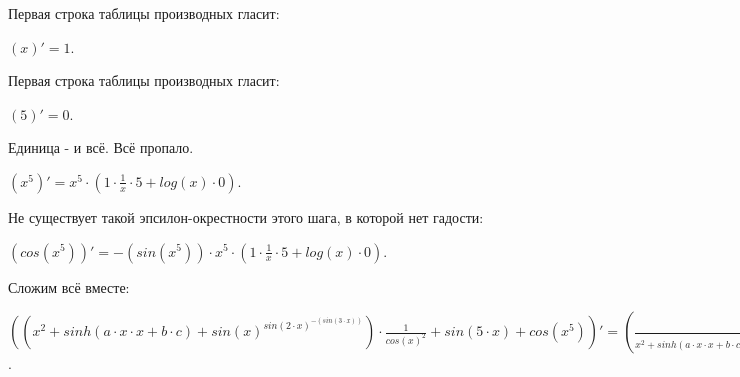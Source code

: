 \documentclass{article}
\begin{document}
Первая строка таблицы производных гласит:\\
\begin{center}$(x)' = 1$.\end{center}
Первая строка таблицы производных гласит:\\
\begin{center}$({5})' = 0$.\end{center}
Единица - и всё. Всё пропало.\\
\begin{center}$({x^{{5}}})'= {x^{{5}}} \cdot ({1} \cdot  \frac {1} {{x}} \cdot {{5}}+log(x) \cdot {0})$.\end{center}
Не существует такой эпсилон-окрестности этого шага, в которой нет гадости:\\
\begin{center}$(cos({x^{{5}}}))'= -(sin({x^{{5}}})) \cdot {x^{{5}}} \cdot ({1} \cdot  \frac {1} {{x}} \cdot {{5}}+log(x) \cdot {0})$.\end{center}
Сложим всё вместе:\\
\begin{center}$(({x^{{2}}}+sinh(a \cdot x \cdot x+b \cdot c)+{sin(x)^{sin({2} \cdot x)^{-(sin({3} \cdot x))}}}) \cdot  \frac {1} {{{cos(x)^{{2}}}}}+sin({5} \cdot x)+cos({x^{{5}}}))'= ( \frac {1} {{{x^{{2}}}+sinh(a \cdot x \cdot x+b \cdot c)+{sin(x)^{sin({2} \cdot x)^{-(sin({3} \cdot x))}}}}} \cdot ({x^{{2}}} \cdot ({1} \cdot  \frac {1} {{x}} \cdot {{2}}+log(x) \cdot {0})+cosh(a \cdot x \cdot x+b \cdot c) \cdot (( \frac {1} {{a}} \cdot {0}+ \frac {1} {{x}} \cdot {1}+ \frac {1} {{x}} \cdot {1}) \cdot a \cdot x \cdot x+( \frac {1} {{b}} \cdot {0}+ \frac {1} {{c}} \cdot {0}) \cdot b \cdot c)+{sin(x)^{sin({2} \cdot x)^{-(sin({3} \cdot x))}}} \cdot (cos(x) \cdot {1} \cdot  \frac {1} {{sin(x)}} \cdot  \frac {1} {{sin({2} \cdot x)} ^ {sin({3} \cdot x)}}+log(sin(x)) \cdot  \frac {1} {{sin({2} \cdot x)} ^ {sin({3} \cdot x)}} \cdot (cos({2} \cdot x) \cdot ( \frac {1} {{{2}}} \cdot {0}+ \frac {1} {{x}} \cdot {1}) \cdot {2} \cdot x \cdot  \frac {1} {{sin({2} \cdot x)}} \cdot {-(sin({3} \cdot x))}+log(sin({2} \cdot x)) \cdot -(cos({3} \cdot x) \cdot ( \frac {1} {{{3}}} \cdot {0}+ \frac {1} {{x}} \cdot {1}) \cdot {3} \cdot x))))+ \frac {1} {{ \frac {1} {{{cos(x)^{{2}}}}}}} \cdot  \frac {1} {{{cos(x)^{{2}}}}} \cdot ({cos(x)^{{2}}} \cdot (-(sin(x)) \cdot {1} \cdot  \frac {1} {{cos(x)}} \cdot {{2}}+log(cos(x)) \cdot {0}) \cdot  \frac {1} {{{cos(x)^{{2}}}}} \cdot {{-1}}+log({cos(x)^{{2}}}) \cdot {0})) \cdot ({x^{{2}}}+sinh(a \cdot x \cdot x+b \cdot c)+{sin(x)^{sin({2} \cdot x)^{-(sin({3} \cdot x))}}}) \cdot  \frac {1} {{{cos(x)^{{2}}}}}+cos({5} \cdot x) \cdot ( \frac {1} {{{5}}} \cdot {0}+ \frac {1} {{x}} \cdot {1}) \cdot {5} \cdot x+-(sin({x^{{5}}})) \cdot {x^{{5}}} \cdot ({1} \cdot  \frac {1} {{x}} \cdot {{5}}+log(x) \cdot {0})$.\end{center}
\end{document}
